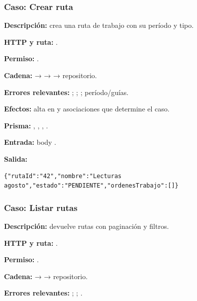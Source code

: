 \subsubsection{Caso: Crear ruta}


\textbf{Descripción:} crea una ruta de trabajo con su período y tipo.  

\textbf{HTTP y ruta:} \texttt{}.  

\textbf{Permiso:} \texttt{}.  

\textbf{Cadena:} \texttt{} → \texttt{} → \texttt{} → repositorio.  

\textbf{Errores relevantes:} \texttt{}; \texttt{}; \texttt{}; \texttt{} período/guías.  

\textbf{Efectos:} alta en \texttt{} y asociaciones que determine el caso.  

\textbf{Prisma:} \texttt{}, \texttt{}, \texttt{}, \texttt{}.  

\textbf{Entrada:} body \texttt{}.  

\textbf{Salida:}


\begin{lstlisting}
{"rutaId":"42","nombre":"Lecturas agosto","estado":"PENDIENTE","ordenesTrabajo":[]}
\end{lstlisting}


\subsubsection{Caso: Listar rutas}


\textbf{Descripción:} devuelve rutas con paginación y filtros.  

\textbf{HTTP y ruta:} \texttt{}.  

\textbf{Permiso:} \texttt{}.  

\textbf{Cadena:} \texttt{} → \texttt{} → repositorio.  

\textbf{Errores relevantes:} \texttt{}; \texttt{}; \texttt{}.  

